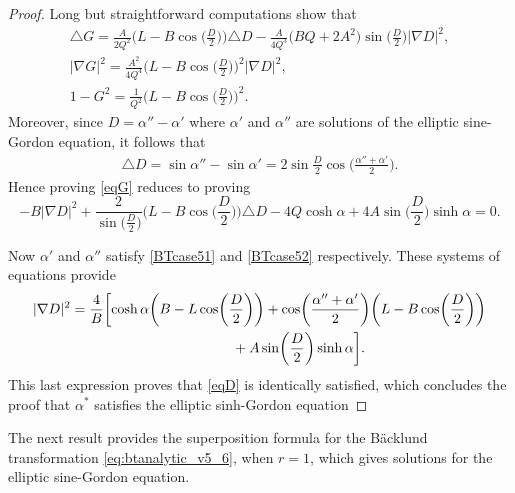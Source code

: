 \documentclass[pdftex]{sigma}
\numberwithin{equation}{section}
\begin{document}
\begin{proof}
Long but straightforward computations show that
\begin{gather*}
 \triangle G = \frac{A}{2 Q^2}\biggl(L-B\cos\biggl(\frac{D}{2}\biggr) \biggr) {\triangle D}
-\frac{A}{4Q^3}\bigl(BQ+2A^2\bigr)\sin \biggl(\frac{D}{2}\biggr) |\nabla D|^2, \\
 |\nabla G|^2 = \frac{A^2}{4 Q^4}\biggl(L-B\cos\biggl(\frac{D}{2}\biggr) \biggr)^2 |\nabla D|^2,\\
 1-G^2 = \frac{1}{Q^2}\biggl(L-B\cos\biggl(\frac{D}{2}\biggr) \biggr)^2.
\end{gather*}
Moreover, since $D=\alpha''-\alpha'$ where $\alpha'$ and $\alpha''$ are solutions of the elliptic sine-Gordon equation, it follows that
\begin{eqnarray*}
 \triangle D=\sin \alpha''-\sin \alpha'= 2\sin\frac{D}{2}\cos\biggl(\frac{\alpha''+\alpha'}{2}\biggr).
\end{eqnarray*}
Hence proving \eqref{eqG} reduces to proving
\begin{equation}\label{eqD}
-B|\nabla D|^2+\frac{2}{\sin\bigl(\frac{D}{2}\bigr)}\biggl(L-B\cos\biggl(\frac{D}{2}\biggr)\biggr)\triangle D-4Q\cosh
\alpha+4A\sin\biggl(\frac{D}{2}\biggr)\sinh\alpha=0.
\end{equation}

Now $\alpha'$ and $\alpha''$ satisfy \eqref{BTcase51} and \eqref{BTcase52} respectively.
These systems of equations provide
\begin{gather*}
 |\nabla D|^2= \frac{4}{B}
 \biggl[\cosh \alpha \biggl( B-L\cos\biggl(\frac{D}{2}\biggr)\biggr) +
 \cos \biggl(\frac{\alpha''+\alpha'}{2}\biggr)\biggl( L-B\cos\biggl(\frac{D}{2}\biggr)\biggr)
 \nonumber \\ \hphantom{|\nabla D|^2= \frac{4}{B}\biggl[}{}
 + A\sin \biggl(\frac{D}{2}\biggr)\sinh \alpha\biggr].
\end{gather*}
This last expression proves that \eqref{eqD} is identically satisfied, which concludes the proof that
$\alpha^*$ satisfies the elliptic sinh-Gordon equation
\end{proof}

The next result provides the superposition formula for the B\"acklund transformation \eqref{eq:btanalytic_v5_6}, when $r=1$, which gives solutions for the elliptic sine-Gordon equation.
\end{document}
